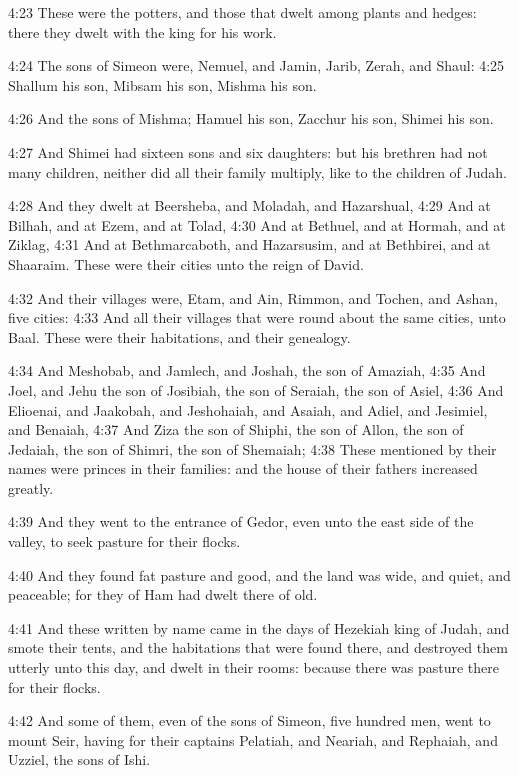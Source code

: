 4:23 These were the potters, and those that dwelt among plants and
hedges: there they dwelt with the king for his work.

4:24 The sons of Simeon were, Nemuel, and Jamin, Jarib, Zerah, and
Shaul: 4:25 Shallum his son, Mibsam his son, Mishma his son.

4:26 And the sons of Mishma; Hamuel his son, Zacchur his son, Shimei
his son.

4:27 And Shimei had sixteen sons and six daughters: but his brethren
had not many children, neither did all their family multiply, like to
the children of Judah.

4:28 And they dwelt at Beersheba, and Moladah, and Hazarshual, 4:29
And at Bilhah, and at Ezem, and at Tolad, 4:30 And at Bethuel, and at
Hormah, and at Ziklag, 4:31 And at Bethmarcaboth, and Hazarsusim, and
at Bethbirei, and at Shaaraim. These were their cities unto the reign
of David.

4:32 And their villages were, Etam, and Ain, Rimmon, and Tochen, and
Ashan, five cities: 4:33 And all their villages that were round about
the same cities, unto Baal. These were their habitations, and their
genealogy.

4:34 And Meshobab, and Jamlech, and Joshah, the son of Amaziah, 4:35
And Joel, and Jehu the son of Josibiah, the son of Seraiah, the son of
Asiel, 4:36 And Elioenai, and Jaakobah, and Jeshohaiah, and Asaiah,
and Adiel, and Jesimiel, and Benaiah, 4:37 And Ziza the son of Shiphi,
the son of Allon, the son of Jedaiah, the son of Shimri, the son of
Shemaiah; 4:38 These mentioned by their names were princes in their
families: and the house of their fathers increased greatly.

4:39 And they went to the entrance of Gedor, even unto the east side
of the valley, to seek pasture for their flocks.

4:40 And they found fat pasture and good, and the land was wide, and
quiet, and peaceable; for they of Ham had dwelt there of old.

4:41 And these written by name came in the days of Hezekiah king of
Judah, and smote their tents, and the habitations that were found
there, and destroyed them utterly unto this day, and dwelt in their
rooms: because there was pasture there for their flocks.

4:42 And some of them, even of the sons of Simeon, five hundred men,
went to mount Seir, having for their captains Pelatiah, and Neariah,
and Rephaiah, and Uzziel, the sons of Ishi.

